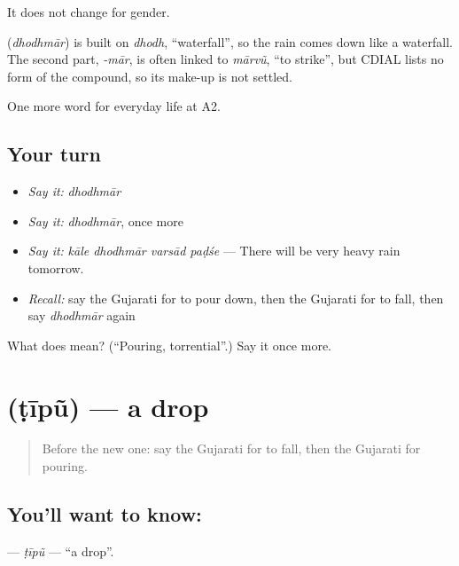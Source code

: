 It does not change for gender.

\begin{cousinweb}
\textbf{} (\emph{dhodhmār}) is built on \emph{dhodh}, \textquotedblleft{}waterfall\textquotedblright{}, so the rain comes down like a waterfall. The second part, \emph{-mār}, is often linked to \emph{mārvũ}, \textquotedblleft{}to strike\textquotedblright{}, but CDIAL lists no form of the compound, so its make-up is not settled.
\end{cousinweb}

\begin{grammarlens}[title={What you've built}]
One more word for everyday life at A2.
\end{grammarlens}

\subsection*{Your turn}
\begin{itemize}
\raggedright
  \item \emph{Say it:} \emph{dhodhmār}
  \item \emph{Say it:} \emph{dhodhmār}, once more
  \item \emph{Say it:} \emph{kāle dhodhmār varsād paḍśe} — There will be very heavy rain tomorrow.
  \item \emph{Recall:} say the Gujarati for to pour down, then the Gujarati for to fall, then say \emph{dhodhmār} again
\end{itemize}

\begin{tcolorbox}[breakable,colback=teal!4,colframe=teal!35!black,title={Before you move on}]
What does  mean? (\textquotedblleft{}Pouring, torrential\textquotedblright{}.) Say it once more.
\end{tcolorbox}
\section[\texorpdfstring{\gu{ટીપું} (ṭīpũ)}{ટીપું (ṭīpũ)}]{ (ṭīpũ) — a drop}

\label{lesson:GU-C214-tipu}



\begin{quote}
Before the new one: say the Gujarati for to fall, then the Gujarati for pouring.
\end{quote}

\subsection*{You'll want to know: }
\textbf{} — \emph{ṭīpũ} — \textquotedblleft{}a drop\textquotedblright{}.

